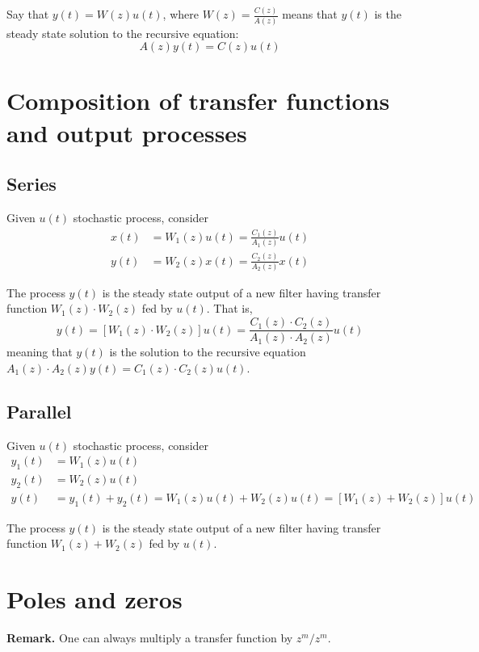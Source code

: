 Say that $y(t)=W(z)u(t)$, where $W(z)=\frac{C(z)}{A(z)}$ means that $y(t)$ is the steady state solution to the recursive equation:
\[
	A(z)y(t)=C(z)u(t)
\]

\section{Composition of transfer functions and output processes}
\subsection{Series}
Given $u(t)$ stochastic process, consider
\begin{align*}
	x(t)&=W_{1}(z)u(t)=\frac{C_{1}(z)}{A_{1}(z)}u(t)\\
	y(t)&=W_{2}(z)x(t)=\frac{C_{2}(z)}{A_{2}(z)}x(t)
\end{align*}
\begin{theorem}
	The process $y(t)$ is the steady state output of a new filter having transfer function $W_{1}(z)\cdot W_{2}(z)$ fed by $u(t)$. That is,
	\[
		y(t)=[W_{1}(z)\cdot W_{2}(z)]u(t)=\frac{C_{1}(z)\cdot C_{2}(z)}{A_{1}(z)\cdot A_{2}(z)}u(t)
	\]
	meaning that $y(t)$ is the solution to the recursive equation $A_{1}(z)\cdot A_{2}(z) y(t) = C_{1}(z)\cdot C_{2}(z)u(t)$.
\end{theorem}

\subsection{Parallel}
Given $u(t)$ stochastic process, consider
\begin{align*}
	y_{1}(t)&=W_{1}(z)u(t)\\
	y_{2}(t)&=W_{2}(z)u(t)\\
	y(t)&=y_{1}(t)+y_{2}(t)=W_{1}(z)u(t)+W_{2}(z)u(t)=[W_{1}(z)+W_{2}(z)]u(t)
\end{align*}
\begin{theorem}
	The process $y(t)$ is the steady state output of a new filter having transfer function $W_{1}(z)+W_{2}(z)$ fed by $u(t)$.
\end{theorem}

\section{Poles and zeros}

\textbf{Remark.}
One can always multiply a transfer function by $z^{m}/z^{m}$.

